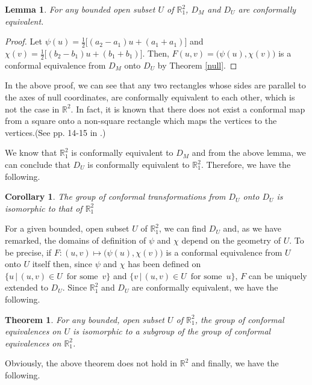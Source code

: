 \documentclass[a4paper,10pt]{amsart}
\theoremstyle{plain}
\newtheorem{thm}{Theorem}[section]
\newtheorem{lemma}{Lemma}[section]
\newtheorem*{corollary}{Corollary}
\newtheorem*{main theorem}{Theorem}
\theoremstyle{definition}
\begin{document}
\begin{lemma}
For any bounded open subset $U$ of $\mathbb{R}^2_1$, $D_M$ and
$D_U$ are conformally equivalent.
\end{lemma}
\begin{proof}
Let $\psi(u) = \frac{1}{2} \big[ (a_2 - a_1)u + (a_1+a_1) \big]$
and $\chi(v) = \frac{1}{2} \big[ (b_2-b_1)u + (b_1+b_1) \big]$.
Then, $F(u,v) = \big( \psi(u), \chi(v) \big)$ is a conformal
equivalence from $D_M$ onto $D_U$ by Theorem \ref{null}.
\end{proof}

In the above proof, we can see that any two rectangles whose sides
are parallel to the axes of null coordinates, are conformally
equivalent to each other, which is not the case in $\mathbb{R}^2$.
In fact, it is known that there does not exist a conformal map
from a square onto a non-square rectangle which maps the vertices
to the vertices.(See pp. 14-15 in \cite{Lehto}.)


 We know that $\mathbb{R}^2_1$ is conformally equivalent to $D_M$
 and from the above lemma, we can conclude that $D_U$ is
 conformally equivalent to $\mathbb{R}^2_1$. Therefore, we have
 the following.

\begin{corollary}
 The group of conformal transformations from $D_U$ onto $D_U$ is isomorphic to
 that of $\mathbb{R}^2_1$
 \end{corollary}

For a given bounded, open subset $U$ of $\mathbb{R}^2_1$, we can
find $D_U$ and, as we have remarked, the domains of definition of
$\psi$ and $\chi$ depend on the geometry of $U$. To be precise, if
$F : (u,v) \mapsto \big( \psi(u), \chi(v) \big)$ is a conformal
equivalence from $U$ onto $U$ itself then, since $\psi$ and $\chi$
has been defined on $\{ u \, | \, (u,v) \in U \,\,\, \mbox{for
some} \,\,\, v \}$ and $\{ v \, | \, (u,v) \in U \,\,\, \mbox{for
some} \,\,\, u \}$, $F$ can be uniquely extended to $D_U$. Since
$\mathbb{R}^2_1$ and $D_U$ are conformally equivalent, we have the
following.

\begin{thm}
For any bounded, open subset $U$ of $\mathbb{R}^2_1$, the group of
conformal equivalences on $U$ is isomorphic to a subgroup of the
group of conformal equivalences on $\mathbb{R}^2_1$.
\end{thm}

Obviously, the above theorem does not hold in $\mathbb{R}^2$ and
finally, we have the following.
\end{document}
